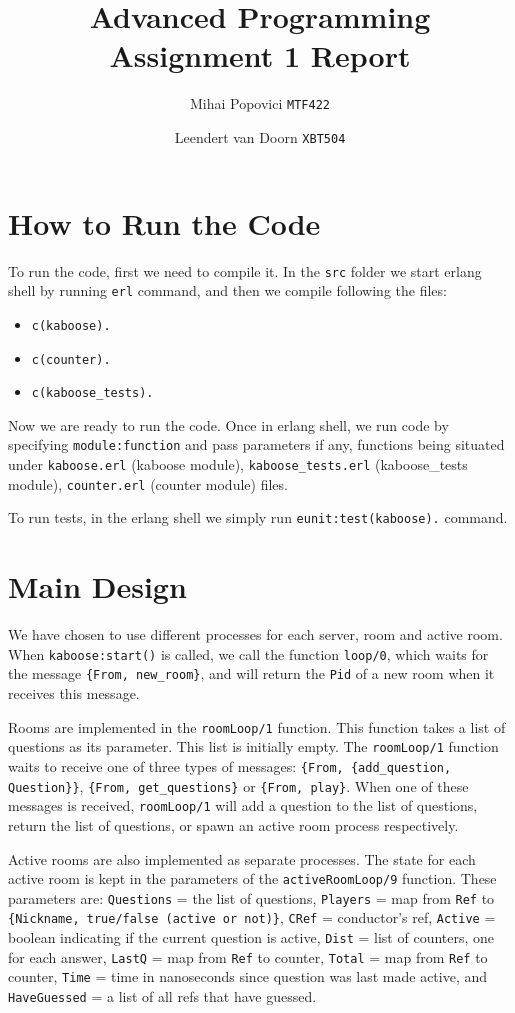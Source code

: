 \documentclass{article}
\title{Advanced Programming Assignment 1 Report}
\author{Mihai Popovici \texttt{MTF422} \and Leendert van Doorn \texttt{XBT504}}
\begin{document}
\maketitle	

\section{How to Run the Code}
To run the code, first we need to compile it. In the \texttt{src} folder we start erlang shell by running \texttt{erl} command, and then we compile following the files:
\begin{itemize}
	\item \texttt{c(kaboose).}
	\item \texttt{c(counter).}
	\item \texttt{c(kaboose\_tests).}
\end{itemize} 
Now we are ready to run the code. Once in erlang shell, we run code by specifying \texttt{module:function} and pass parameters if any, functions being situated under \texttt{kaboose.erl} (kaboose module), \texttt{kaboose\_tests.erl} (kaboose\_tests module), \texttt{counter.erl} (counter module) files.

To run tests, in the erlang shell we simply run \texttt{eunit:test(kaboose).} command.

\section{Main Design}
We have chosen to use different processes for each server, room and active room. When \texttt{kaboose:start()} is called, we call the function \texttt{loop/0}, which waits for the message \texttt{\{From, new\_room\}}, and will return the \texttt{Pid} of a new room when it receives this message.

Rooms are implemented in the \texttt{roomLoop/1} function. This function takes a list of questions as its parameter. This list is initially empty. The \texttt{roomLoop/1} function waits to receive one of three types of messages: \texttt{\{From, \{add\_question, Question\}\}}, \texttt{\{From, get\_questions\}} or \texttt{\{From, play\}}. When one of these messages is received, \texttt{roomLoop/1} will add a question to the list of questions, return the list of questions, or spawn an active room process respectively.

Active rooms are also implemented as separate processes. The state for each active room is kept in the parameters of the \texttt{activeRoomLoop/9} function. These parameters are: \texttt{Questions} = the list of questions, \texttt{Players} = map from \texttt{Ref} to \texttt{\{Nickname, true/false (active or not)\}}, \texttt{CRef} = conductor's ref, \texttt{Active} = boolean indicating if the current question is active, \texttt{Dist} = list of counters, one for each answer, \texttt{LastQ} = map from \texttt{Ref} to counter, \texttt{Total} = map from \texttt{Ref} to counter, \texttt{Time} = time in nanoseconds since question was last made active, and \texttt{HaveGuessed} = a list of all refs that have guessed.
\end{document}
